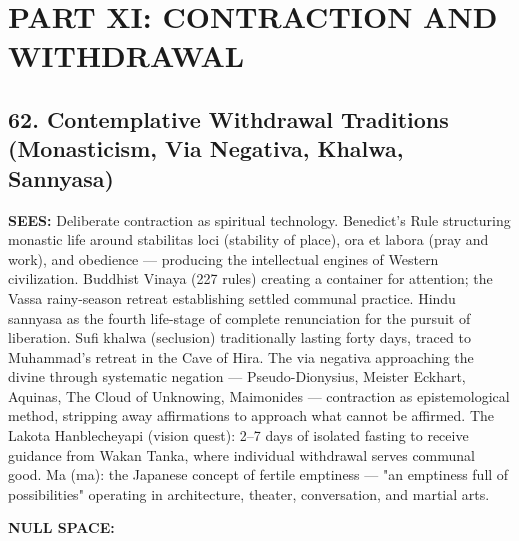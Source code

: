\section*{PART XI: CONTRACTION AND WITHDRAWAL}


\subsection*{62. Contemplative Withdrawal Traditions (Monasticism, Via Negativa, Khalwa, Sannyasa)}


\textbf{SEES:} Deliberate contraction as spiritual technology. Benedict's Rule structuring monastic life around stabilitas loci (stability of place), ora et labora (pray and work), and obedience — producing the intellectual engines of Western civilization. Buddhist Vinaya (227 rules) creating a container for attention; the Vassa rainy-season retreat establishing settled communal practice. Hindu sannyasa as the fourth life-stage of complete renunciation for the pursuit of liberation. Sufi khalwa (seclusion) traditionally lasting forty days, traced to Muhammad's retreat in the Cave of Hira. The via negativa approaching the divine through systematic negation — Pseudo-Dionysius, Meister Eckhart, Aquinas, The Cloud of Unknowing, Maimonides — contraction as epistemological method, stripping away affirmations to approach what cannot be affirmed. The Lakota Hanblecheyapi (vision quest): 2–7 days of isolated fasting to receive guidance from Wakan Tanka, where individual withdrawal serves communal good. Ma ({ma}): the Japanese concept of fertile emptiness — "an emptiness full of possibilities" operating in architecture, theater, conversation, and martial arts.


\textbf{NULL SPACE:}

